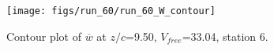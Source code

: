 \begin{figure}[H]
\centering
\texttt{[image: figs/run\_60/run\_60\_W\_contour]}
\caption{Contour plot of $\overline{w}$ at $z/c$=9.50, $V_{free}$=33.04, station 6.}
\end{figure}


